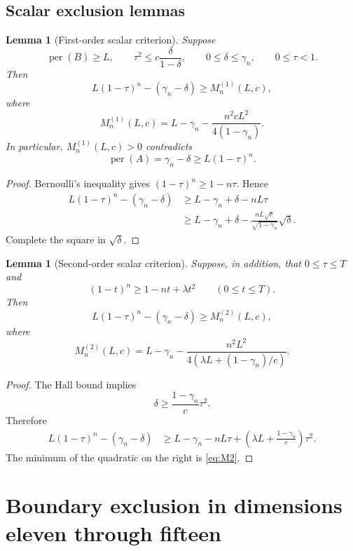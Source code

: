 \documentclass[11pt]{article}
\newtheorem{lemma}[theorem]{Lemma}
\theoremstyle{definition}
\newcommand{\per}{\operatorname{per}}
\newcommand{\1}{\mathbf{1}}
\begin{document}
\subsection{Scalar exclusion lemmas}

\begin{lemma}[First-order scalar criterion]\label{lem:first-order}
Suppose
\[
 \per(B)\ge L,
 \qquad
 \tau^2\le c\frac{\delta}{1-\delta},
 \qquad
 0\le\delta\le\gamma_n,
 \qquad
 0\le\tau<1.
\]
Then
\[
 L(1-\tau)^n-(\gamma_n-\delta)
 \ge
 M_n^{(1)}(L,c),
 \tag{5.24}\label{eq:first-margin}
\]
where
\[
 M_n^{(1)}(L,c)
 =L-\gamma_n-
 \frac{n^2cL^2}{4(1-\gamma_n)}.
 \tag{5.25}\label{eq:M1}
\]
In particular, $M_n^{(1)}(L,c)>0$ contradicts
\[
 \per(A)=\gamma_n-\delta
 \ge L(1-\tau)^n.
\]
\end{lemma}

\begin{proof}
Bernoulli's inequality gives $(1-\tau)^n\ge1-n\tau$.  Hence
\[
 \begin{aligned}
 L(1-\tau)^n-(\gamma_n-\delta)
 &\ge L-\gamma_n+\delta-nL\tau\\
 &\ge L-\gamma_n+\delta
 -\frac{nL\sqrt c}{\sqrt{1-\gamma_n}}\sqrt\delta.
 \end{aligned}
\]
Complete the square in $\sqrt\delta$.
\end{proof}

\begin{lemma}[Second-order scalar criterion]\label{lem:second-order}
Suppose, in addition, that $0\le\tau\le T$ and
\[
 (1-t)^n\ge1-nt+\lambda t^2
 \qquad(0\le t\le T).
 \tag{5.26}\label{eq:quadratic-binomial}
\]
Then
\[
 L(1-\tau)^n-(\gamma_n-\delta)
 \ge
 M_n^{(2)}(L,c),
 \tag{5.27}\label{eq:second-margin}
\]
where
\[
 M_n^{(2)}(L,c)
 =L-\gamma_n-
 \frac{n^2L^2}
 {4\left(\lambda L+(1-\gamma_n)/c\right)}.
 \tag{5.28}\label{eq:M2}
\]
\end{lemma}

\begin{proof}
The Hall bound implies
\[
 \delta\ge\frac{1-\gamma_n}{c}\tau^2.
\]
Therefore
\[
 \begin{aligned}
 L(1-\tau)^n-(\gamma_n-\delta)
 &\ge L-\gamma_n-nL\tau
 +\left(\lambda L+\frac{1-\gamma_n}{c}\right)\tau^2.
 \end{aligned}
\]
The minimum of the quadratic on the right is \eqref{eq:M2}.
\end{proof}

\section{Boundary exclusion in dimensions eleven through fifteen}\label{sec:mid-high}
\end{document}
